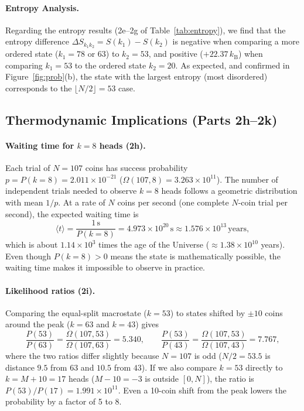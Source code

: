 \documentclass[11pt, a4paper]{article}
\newcommand{\kB}{k_{\mathrm{B}}}
\begin{document}
\paragraph{Entropy Analysis.}
Regarding the entropy results (2e--2g of Table~\ref{tab:entropy}), we find that the entropy difference $\Delta S_{k_1k_2} = S(k_1) - S(k_2)$ is negative when comparing a more ordered state ($k_1=78$ or $63$) to $k_{2}=53$, and positive ($+22.37\,\kB$) when comparing $k_{1}=53$ to the ordered state $k_2=20$. As expected, and confirmed in Figure~\ref{fig:prob}(b), the state with the largest entropy (most disordered) corresponds to the $\lfloor N/2 \rfloor = 53$ case.

\subsection{Thermodynamic Implications (Parts 2h--2k)}

\paragraph{Waiting time for $k=8$ heads (2h).}
Each trial of $N=107$ coins has success probability $p = P(k=8) = 2.011\times 10^{-21}$ ($\Omega(107,8) = 3.263\times 10^{11}$). The number of independent trials needed to observe $k=8$ heads follows a geometric distribution with mean $1/p$. At a rate of $N$ coins per second (one complete $N$-coin trial per second), the expected waiting time is
\begin{equation}
\langle t \rangle = \frac{1\,\mathrm{s}}{P(k=8)} = 4.973\times 10^{20}\,\mathrm{s} \approx 1.576\times 10^{13}\,\mathrm{years},
\end{equation}
which is about $1.14\times 10^3$ times the age of the Universe ($\approx 1.38\times 10^{10}$ years). Even though $P(k=8) > 0$ means the state is mathematically possible, the waiting time makes it impossible to observe in practice.

\paragraph{Likelihood ratios (2i).}
Comparing the equal-split macrostate ($k=53$) to states shifted by $\pm 10$ coins around the peak ($k=63$ and $k=43$) gives
\begin{equation}
\frac{P(53)}{P(63)} = \frac{\Omega(107,53)}{\Omega(107,63)} = 5.340, \qquad \frac{P(53)}{P(43)} = \frac{\Omega(107,53)}{\Omega(107,43)} = 7.767,
\end{equation}
where the two ratios differ slightly because $N=107$ is odd ($N/2 = 53.5$ is distance $9.5$ from $63$ and $10.5$ from $43$). If we also compare $k=53$ directly to $k = M + 10 = 17$ heads ($M-10 = -3$ is outside $[0,N]$), the ratio is $P(53)/P(17) = 1.991\times 10^{11}$. Even a 10-coin shift from the peak lowers the probability by a factor of 5 to 8.
\end{document}
